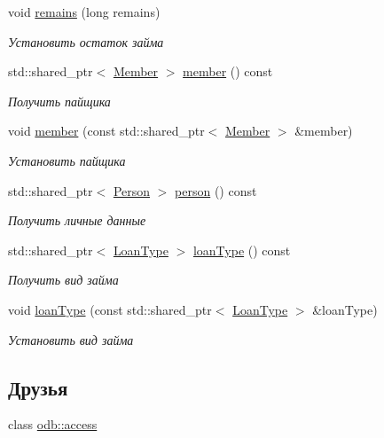 \begin{DoxyCompactItemize}
void \hyperlink{classkpk_1_1data_1_1_loan_a242c59d916d1d2dd17d579bfac388e4a}{remains} (long remains)
\begin{DoxyCompactList}\small\item\em Установить остаток займа \end{DoxyCompactList}\item 
std\+::shared\+\_\+ptr$<$ \hyperlink{classkpk_1_1data_1_1_member}{Member} $>$ \hyperlink{classkpk_1_1data_1_1_loan_a37fb3cc07280aa8310a32b4477b5528f}{member} () const 
\begin{DoxyCompactList}\small\item\em Получить пайщика \end{DoxyCompactList}\item 
void \hyperlink{classkpk_1_1data_1_1_loan_afecd269c6ce5285602760df1bce52a41}{member} (const std\+::shared\+\_\+ptr$<$ \hyperlink{classkpk_1_1data_1_1_member}{Member} $>$ \&member)
\begin{DoxyCompactList}\small\item\em Установить пайщика \end{DoxyCompactList}\item 
std\+::shared\+\_\+ptr$<$ \hyperlink{classkpk_1_1data_1_1_person}{Person} $>$ \hyperlink{classkpk_1_1data_1_1_loan_abace5ace0d55d9e640a1d96fcd5c389b}{person} () const 
\begin{DoxyCompactList}\small\item\em Получить личные данные \end{DoxyCompactList}\item 
std\+::shared\+\_\+ptr$<$ \hyperlink{classkpk_1_1data_1_1_loan_type}{Loan\+Type} $>$ \hyperlink{classkpk_1_1data_1_1_loan_a791850364c82ef161f09669c64bcc2a3}{loan\+Type} () const 
\begin{DoxyCompactList}\small\item\em Получить вид займа \end{DoxyCompactList}\item 
void \hyperlink{classkpk_1_1data_1_1_loan_a4f6570e5a76b24dfa70009b0b60283a6}{loan\+Type} (const std\+::shared\+\_\+ptr$<$ \hyperlink{classkpk_1_1data_1_1_loan_type}{Loan\+Type} $>$ \&loan\+Type)
\begin{DoxyCompactList}\small\item\em Установить вид займа \end{DoxyCompactList}\end{DoxyCompactItemize}
\subsection*{Друзья}
\begin{DoxyCompactItemize}
\item 
class \hyperlink{classkpk_1_1data_1_1_loan_acb4d953abf85ae525f1d06a0c3a86a55}{odb\+::access}
\end{DoxyCompactItemize}


